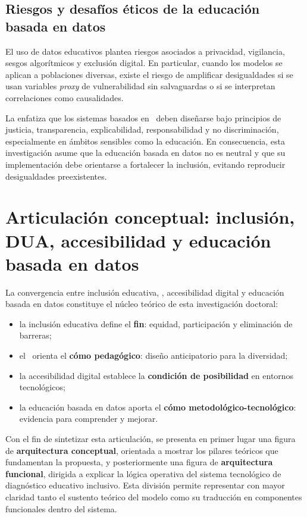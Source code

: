 \begin{refsection}
\subsection{Riesgos y desafíos éticos de la educación basada en datos}

El uso de datos educativos plantea riesgos asociados a privacidad, vigilancia, sesgos algorítmicos y exclusión digital. En particular, cuando los modelos se aplican a poblaciones diversas, existe el riesgo de amplificar desigualdades si se usan variables \textit{proxy} de vulnerabilidad sin salvaguardas o si se interpretan correlaciones como causalidades.

La \textcite{unesco2021} enfatiza que los sistemas basados en \IA\ deben diseñarse bajo principios de justicia, transparencia, explicabilidad, responsabilidad y no discriminación, especialmente en ámbitos sensibles como la educación. En consecuencia, esta investigación asume que la educación basada en datos no es neutral y que su implementación debe orientarse a fortalecer la inclusión, evitando reproducir desigualdades preexistentes.

\section{Articulación conceptual: inclusión, DUA, accesibilidad y educación basada en datos}

La convergencia entre inclusión educativa, \DUA, accesibilidad digital y educación basada en datos constituye el núcleo teórico de esta investigación doctoral:

\begin{itemize}
\item la inclusión educativa define el \textbf{fin}: equidad, participación y eliminación de barreras;
\item el \DUA\ orienta el \textbf{cómo pedagógico}: diseño anticipatorio para la diversidad;
\item la accesibilidad digital establece la \textbf{condición de posibilidad} en entornos tecnológicos;
\item la educación basada en datos aporta el \textbf{cómo metodológico-tecnológico}: evidencia para comprender y mejorar.
\end{itemize}

Con el fin de sintetizar esta articulación, se presenta en primer lugar una figura de \textbf{arquitectura conceptual}, orientada a mostrar los pilares teóricos que fundamentan la propuesta, y posteriormente una figura de \textbf{arquitectura funcional}, dirigida a explicar la lógica operativa del sistema tecnológico de diagnóstico educativo inclusivo. Esta división permite representar con mayor claridad tanto el sustento teórico del modelo como su traducción en componentes funcionales dentro del sistema.


\end{refsection}
